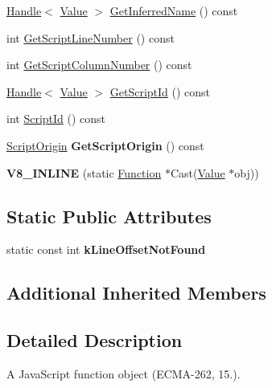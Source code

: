 \begin{DoxyCompactItemize}
\item 
\hyperlink{classv8_1_1_handle}{Handle}$<$ \hyperlink{classv8_1_1_value}{Value} $>$ \hyperlink{classv8_1_1_function_a5bd3ad2f8144be5d9b383b1cd9b30df5}{Get\+Inferred\+Name} () const 
\item 
int \hyperlink{classv8_1_1_function_ae64de1b9dc1ea5dc4f419a88808c12c5}{Get\+Script\+Line\+Number} () const 
\item 
int \hyperlink{classv8_1_1_function_abfe6a9251c5dfc995b83dcf3032fdc86}{Get\+Script\+Column\+Number} () const 
\item 
\hyperlink{classv8_1_1_handle}{Handle}$<$ \hyperlink{classv8_1_1_value}{Value} $>$ \hyperlink{classv8_1_1_function_ab54eaa80d1bfb8c5bfdd89dc32877995}{Get\+Script\+Id} () const 
\item 
int \hyperlink{classv8_1_1_function_afa208e62e702f6d61ba0a4250ba3f2cf}{Script\+Id} () const 
\item 
\hypertarget{classv8_1_1_function_af9c77c9bcbf698727071c7153e7c2513}{}\hyperlink{classv8_1_1_script_origin}{Script\+Origin} {\bfseries Get\+Script\+Origin} () const \label{classv8_1_1_function_af9c77c9bcbf698727071c7153e7c2513}

\item 
\hypertarget{classv8_1_1_function_a3e01ceeeffac9e97502fa12e38f89536}{}{\bfseries V8\+\_\+\+I\+N\+L\+I\+N\+E} (static \hyperlink{classv8_1_1_function}{Function} $\ast$Cast(\hyperlink{classv8_1_1_value}{Value} $\ast$obj))\label{classv8_1_1_function_a3e01ceeeffac9e97502fa12e38f89536}

\end{DoxyCompactItemize}
\subsection*{Static Public Attributes}
\begin{DoxyCompactItemize}
\item 
\hypertarget{classv8_1_1_function_acf0af24f79908e405a6ac435277596d9}{}static const int {\bfseries k\+Line\+Offset\+Not\+Found}\label{classv8_1_1_function_acf0af24f79908e405a6ac435277596d9}

\end{DoxyCompactItemize}
\subsection*{Additional Inherited Members}


\subsection{Detailed Description}
A Java\+Script function object (E\+C\+M\+A-\/262, 15.). 

